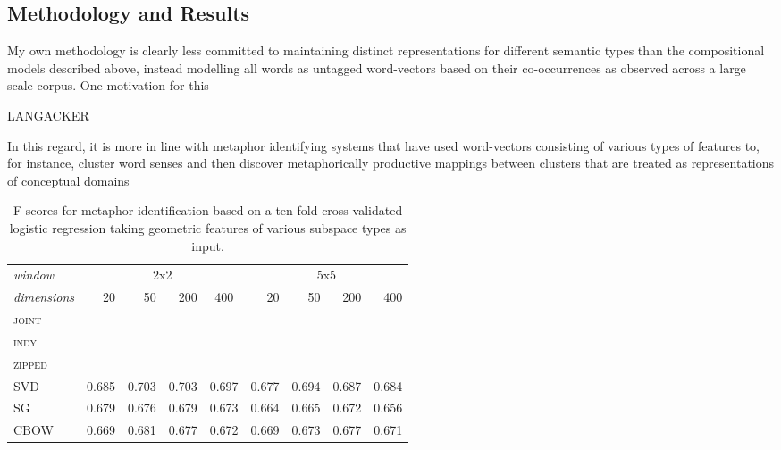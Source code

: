 
\subsection{Methodology and Results}
My own methodology is clearly less committed to maintaining distinct representations for different semantic types than the compositional models described above, instead modelling all words as untagged word-vectors based on their co-occurrences as observed across a large scale corpus.  One motivation for this 

LANGACKER

In this regard, it is more in line with metaphor identifying systems that have used word-vectors consisting of various types of features to, for instance, cluster word senses and then discover metaphorically productive mappings between clusters that are treated as representations of conceptual domains

\begin{table}
\centering
\begin{tabular}{lrrrr|rrrr}
\hline
\emph{window} & \multicolumn{4}{c}{2x2} & \multicolumn{4}{c}{5x5} \\
\emph{dimensions} & 20 & 50 & 200 & \multicolumn{1}{c}{400} & 20 & 50 & 200 & 400 \\
\hline
\textsc{joint} \\
\textsc{indy} \\
\textsc{zipped} \\
\textsc{SVD} & 0.685 & 0.703 & 0.703 & 0.697 & 0.677 & 0.694 & 0.687 & 0.684 \\
\textsc{SG} & 0.679 & 0.676 & 0.679 & 0.673 & 0.664 & 0.665 & 0.672 & 0.656 \\
\textsc{CBOW} & 0.669 & 0.681 & 0.677 & 0.672 & 0.669 & 0.673 & 0.677 & 0.671 \\
\hline
\end{tabular}
\caption{F-scores for metaphor identification based on a ten-fold cross-validated logistic regression taking geometric features of various subspace types as input.}
\label{tab:related}
\end{table}

